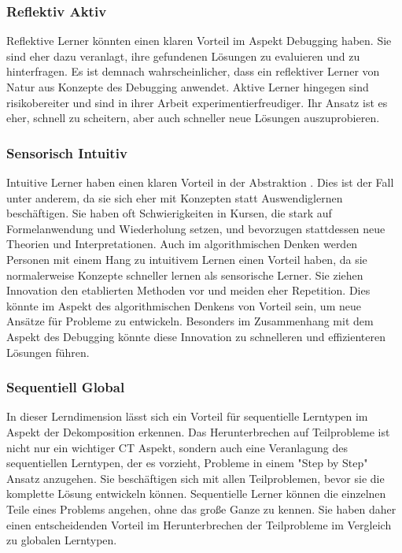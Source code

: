 \subsubsection{Reflektiv Aktiv}
Reflektive Lerner könnten einen klaren Vorteil im Aspekt Debugging haben. Sie sind eher dazu veranlagt, ihre gefundenen Lösungen zu evaluieren und zu hinterfragen. Es ist demnach wahrscheinlicher, dass ein reflektiver Lerner von Natur aus Konzepte des Debugging anwendet. Aktive Lerner hingegen sind risikobereiter und sind in ihrer Arbeit experimentierfreudiger. Ihr Ansatz ist es eher, schnell zu scheitern, aber auch schneller neue Lösungen auszuprobieren.

\subsubsection{Sensorisch Intuitiv}
Intuitive Lerner haben einen klaren Vorteil in der Abstraktion \cite{felderhandout}. Dies ist der Fall unter anderem, da sie sich eher mit Konzepten statt Auswendiglernen beschäftigen. Sie haben oft Schwierigkeiten in Kursen, die stark auf Formelanwendung und Wiederholung setzen, und bevorzugen stattdessen neue Theorien und Interpretationen.
Auch im algorithmischen Denken werden Personen mit einem Hang zu intuitivem Lernen einen Vorteil haben, da sie normalerweise Konzepte schneller lernen als sensorische Lerner. Sie ziehen Innovation den etablierten Methoden vor und meiden eher Repetition. Dies könnte im Aspekt des algorithmischen Denkens von Vorteil sein, um neue Ansätze für Probleme zu entwickeln. Besonders im Zusammenhang mit dem Aspekt des Debugging könnte diese Innovation zu schnelleren und effizienteren Lösungen führen.

\subsubsection{Sequentiell Global}
In dieser Lerndimension lässt sich ein Vorteil für sequentielle Lerntypen im Aspekt der Dekomposition erkennen. Das Herunterbrechen auf Teilprobleme ist nicht nur ein wichtiger CT Aspekt, sondern auch eine Veranlagung des sequentiellen Lerntypen, der es vorzieht, Probleme in einem "Step by Step" Ansatz anzugehen. Sie beschäftigen sich mit allen Teilproblemen, bevor sie die komplette Lösung entwickeln können. Sequentielle Lerner können die einzelnen Teile eines Problems angehen, ohne das große Ganze zu kennen. Sie haben daher einen entscheidenden Vorteil im Herunterbrechen der Teilprobleme im Vergleich zu globalen Lerntypen.

